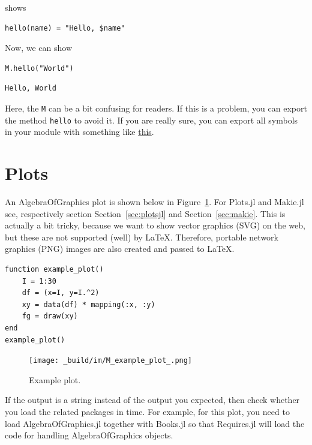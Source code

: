 \documentclass[
  14pt
  american,
  paper=a4,
  ,captions=tableheading
]{scrreprt}
\newcommand{\passthrough}[1]{#1}
\begin{document}
shows

\begin{lstlisting}
hello(name) = "Hello, $name"
\end{lstlisting}

Now, we can show

\begin{lstlisting}
M.hello("World")
\end{lstlisting}

\begin{lstlisting}
Hello, World
\end{lstlisting}

Here, the \passthrough{\lstinline!M!} can be a bit confusing for
readers. If this is a problem, you can export the method
\passthrough{\lstinline!hello!} to avoid it. If you are really sure, you
can export all symbols in your module with something like
\href{https://discourse.julialang.org/t/exportall/4970/16}{this}.

\hypertarget{sec:plots}{%
\section{Plots}\label{sec:plots}}

An AlgebraOfGraphics plot is shown below in
Figure~\ref{fig:example_plot}. For Plots.jl and Makie.jl see,
respectively section Section~\ref{sec:plotsjl} and
Section~\ref{sec:makie}. This is actually a bit tricky, because we want
to show vector graphics (SVG) on the web, but these are not supported
(well) by LaTeX. Therefore, portable network graphics (PNG) images are
also created and passed to LaTeX.

\begin{lstlisting}
function example_plot()
    I = 1:30
    df = (x=I, y=I.^2)
    xy = data(df) * mapping(:x, :y)
    fg = draw(xy)
end
example_plot()
\end{lstlisting}

\begin{figure}
\hypertarget{fig:example_plot}{%
\centering
\texttt{[image: \_build/im/M\_example\_plot\_.png]}
\caption{Example plot.}\label{fig:example_plot}
}
\end{figure}

If the output is a string instead of the output you expected, then check
whether you load the related packages in time. For example, for this
plot, you need to load AlgebraOfGraphics.jl together with Books.jl so
that Requires.jl will load the code for handling AlgebraOfGraphics
objects.
\end{document}

